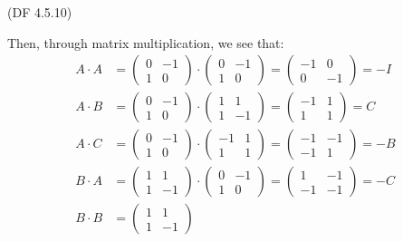 \begin{problem}{(\textsf{DF 4.5.10})}
\begin{enumalph}
\begin{Answer}
        Then, through matrix multiplication, we see that:
        \begin{align*}
          A \cdot A &= \begin{pmatrix} 0 & -1 \\ 1 & 0 \end{pmatrix}
          \cdot \begin{pmatrix} 0 & -1 \\ 1 & 0 \end{pmatrix}
          = \begin{pmatrix} -1 & 0 \\ 0 & -1 \end{pmatrix} = -I \\
          A \cdot B &= \begin{pmatrix} 0 & -1 \\ 1 & 0 \end{pmatrix}
          \cdot \begin{pmatrix} 1 & 1 \\ 1 & -1 \end{pmatrix}
          = \begin{pmatrix} -1 & 1 \\ 1 & 1 \end{pmatrix} = C \\
          A \cdot C &= \begin{pmatrix} 0 & -1 \\ 1 & 0 \end{pmatrix}
          \cdot \begin{pmatrix} -1 & 1 \\ 1 & 1 \end{pmatrix}
          = \begin{pmatrix} -1 & -1 \\ -1 & 1 \end{pmatrix} = -B \\
          B \cdot A &= \begin{pmatrix} 1 & 1 \\ 1 & -1 \end{pmatrix}
          \cdot \begin{pmatrix} 0 & -1 \\ 1 & 0 \end{pmatrix}
          = \begin{pmatrix} 1 & -1 \\ -1 & -1 \end{pmatrix} = -C \\
          B \cdot B &= \begin{pmatrix} 1 & 1 \\ 1 & -1 \end{pmatrix}

\end{align*}
\end{Answer}
\end{enumalph}
\end{problem}
